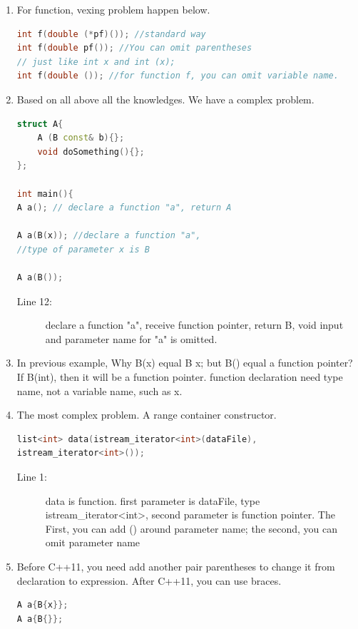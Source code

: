 \documentclass[a4paper,11pt,twoside]{book}
\begin{document}
\begin{enumerate}
	\item For function, vexing problem happen below.
\begin{lstlisting}[frame=single, language=c++, mathescape=true]
int f(double (*pf)()); //standard way
int f(double pf()); //You can omit parentheses
// just like int x and int (x);
int f(double ()); //for function f, you can omit variable name.
\end{lstlisting}
	
	\item Based on all above all the knowledges. We have a complex problem.
\begin{lstlisting}[frame=single, language=c++, mathescape=true]
struct A{
	A (B const& b){};
	void doSomething(){};
};
	
int main(){    
A a(); // declare a function "a", return A
	
A a(B(x)); //declare a function "a",   
//type of parameter x is B

A a(B());  
\end{lstlisting}
\begin{description}
	\item[Line 12:] declare a function "a", receive function pointer, return B, void input and parameter name for "a" is omitted.  
\end{description}
	
	\item In previous example, Why B(x) equal B x; but B() equal a function pointer? If B(int), then it will be a function pointer.  function declaration need type name, not a variable name, such as x.
	
	\item The most complex problem. A range container constructor. 
\begin{lstlisting}[frame=single, language=c++, mathescape=true]
list<int> data(istream_iterator<int>(dataFile), 
istream_iterator<int>()); 

\end{lstlisting}
\begin{description}
	\item[Line 1:] data is function. first parameter is dataFile, type istream\_iterator<int>, second parameter is function pointer. The First, you can add () around parameter name;  the second, you can omit parameter name
\end{description}
	
	\item Before C++11, you need add another pair parentheses to change it from declaration to expression. After C++11, you can use braces.
\begin{lstlisting}[frame=single, language=c++, mathescape=true]
A a{B{x}}; 
A a{B{}};
\end{lstlisting} 
	

\end{enumerate}
\end{document}
